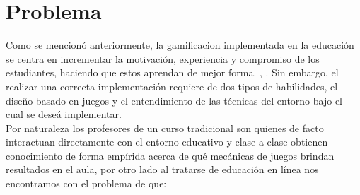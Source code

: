 
\clearpage

\section{Problema}
\label{sec:problematica}


Como se mencionó anteriormente, la \gls{gamificacion} implementada en la educación se centra
en incrementar la motivación, experiencia y compromiso de los estudiantes, haciendo que estos
aprendan de mejor forma. \cite{GamInE-Learning}, \cite{Lee}. 
% 
% 
Sin embargo, el realizar una correcta implementación requiere de dos tipos de habilidades, el
diseño basado en juegos y el entendimiento de las técnicas del entorno bajo el cual se deseá
implementar. \cite[p. 7]{FrameWorkForTheWin}\\

\noindent Por naturaleza los profesores de un curso tradicional son quienes de facto interactuan
directamente con el entorno educativo y clase a clase obtienen conocimiento de forma empírida 
acerca de qué mecánicas de juegos brindan resultados en el aula, por otro lado al tratarse de
educación en línea nos encontramos con el problema de que:\\ %



